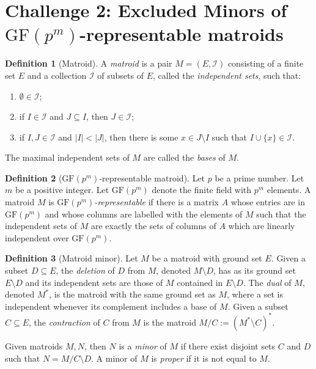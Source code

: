 \documentclass[12pt]{article}
\numberwithin{equation}{section}
\theoremstyle{definition}
\newtheorem{definition}{Definition}
\begin{document}
\section*{Challenge 2: Excluded Minors of $\mathrm{GF}(p^m)$-representable matroids}


\begin{definition}[Matroid]
A \emph{matroid} is a pair $M=(E,\mathcal I)$ consisting of a finite set $E$ and a collection $\mathcal I$ of subsets of $E$, called the \emph{independent sets}, such that:
\begin{enumerate}
\item $\emptyset \in \mathcal I$;
\item if $I\in \mathcal I$ and $J\subseteq I$, then $J\in \mathcal I$;
\item if $I,J\in \mathcal I$ and $|I|<|J|$, then there is some $x\in J\setminus I$ such that $I\cup \{x\}\in \mathcal I$.
\end{enumerate}
The maximal independent sets of $M$ are called the \emph{bases} of $M$.
\end{definition}

\begin{definition}[$\mathrm{GF}(p^m)$-representable matroid]
Let $p$ be a prime number. Let $m$ be a positive integer. Let $\mathrm{GF}(p^m)$ denote the finite field with $p^m$ elements. A matroid $M$ is \emph{$\mathrm{GF}(p^m)$-representable} if there is a matrix $A$  whose entries are in $\mathrm{GF}(p^m)$ and whose columns are labelled with the elements of $M$ such that the independent sets of $M$ are exactly the sets of columns of $A$ which are linearly independent over $\mathrm{GF}(p^m)$.
\end{definition}

\begin{definition}[Matroid minor]
Let $M$ be a matroid with ground set $E$. 
Given a subset $D \subseteq E$, the \emph{deletion} of $D$ from $M$, denoted $M\setminus D$, has as its ground set $E\setminus D$ and its independent sets are those of $M$ contained in $E\setminus D$.
The \textit{dual} of $M$, denoted $M^*$, is the matroid with the same ground set as $M$, where a set is independent whenever its complement includes a base of $M$.  Given a subset $C\subseteq E$, the \emph{contraction} of $C$ from $M$ is the matroid $M/C := (M^* \setminus C)^*$.

Given matroids $M,N$, then $N$ is a \emph{minor} of $M$ if there exist disjoint sets $C$ and $D$ such that $N = M/C \setminus D$. A minor of $M$ is \textit{proper} if it is not equal to $M$.
\end{definition}
\end{document}
